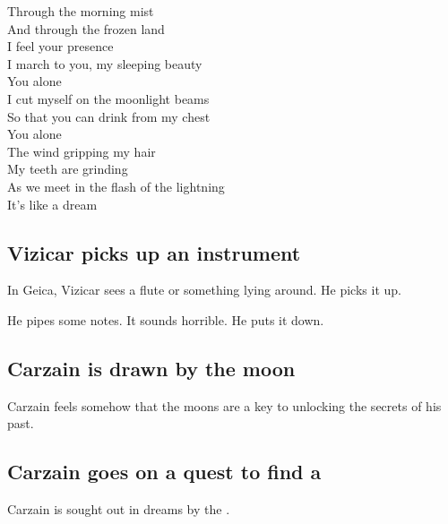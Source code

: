 \begin{garbage}
{  Through the morning mist\\
  And through the frozen land\\
  I feel your presence\\
  I march to you, my sleeping beauty\\
  You alone\\
  I cut myself on the moonlight beams\\
  So that you can drink from my chest\\
  You alone\\
  The wind gripping my hair\\
  My teeth are grinding\\
  As we meet in the flash of the lightning\\
  It's like a dream
}







\subsection{Vizicar picks up an instrument}
In Geica, Vizicar sees a flute or something lying around. He picks it up. 

He pipes some notes. It sounds horrible. He puts it down. 









\subsection{Carzain is drawn by the moon}
Carzain feels somehow that the moons are a key to unlocking the secrets of his past.










\subsection{Carzain goes on a quest to find a \vorcanth}
Carzain is sought out in dreams by the \vorcanths. 


\end{garbage}
